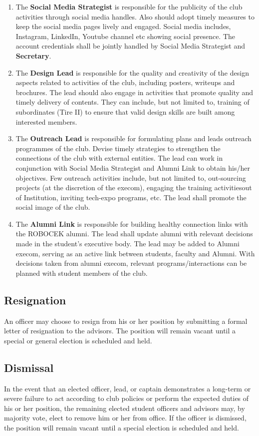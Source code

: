 \begin{enumerate}
	\item The \textbf{Social Media Strategist} is responsible for the publicity of the club
activities through social media handles. Also should adopt timely
	measures to keep the social media pages lively and engaged. Social
media includes, Instagram, LinkedIn, Youtube channel etc showing social
presence. The account credentials shall be jointly handled by Social
Media Strategist and \textbf{Secretary}.
	
	\item The \textbf{Design Lead} is responsible for the quality and creativity of the design
aspects related to activities of the club, including posters, writeups and
brochures. The lead should also engage in activities that promote quality
and timely delivery of contents. They can include, but not limited to,
training of subordinates (Tire II) to ensure that valid design skills are built
among interested members.
	
	\item The \textbf{Outreach Lead} is responsible for formulating plans and leads
outreach programmes of the club. Devise timely strategies to strengthen
the connections of the club with external entities. The lead can work in
conjunction with Social Media Strategist and Alumni Link to obtain his/her
objectives. Few outreach activities include, but not limited to, out-sourcing
projects (at the discretion of the execom), engaging the training activitiesout of Institution, inviting tech-expo programs, etc. The lead shall promote
the social image of the club.
	
	\item The \textbf{Alumni Link} is responsible for building healthy connection links with
the ROBOCEK alumni. The lead shall update alumni with relevant
decisions made in the student's executive body. The lead may be added to
Alumni execom, serving as an active link between students, faculty and
Alumni.
With
decisions
taken
from
alumni
execom,
relevant
programs/interactions can be planned with student members of the club.
	
\end{enumerate}

\subsection{Resignation}
An officer may choose to resign from his or her position by submitting a
formal letter of resignation to the advisors. The position will remain vacant
until a special or general election is scheduled and held.

\subsection{Dismissal}
In the event that an elected officer, lead, or captain demonstrates a
long-term or severe failure to act according to club policies or perform the
expected duties of his or her position, the remaining elected student
officers and advisors may, by majority vote, elect to remove him or her
from office. If the officer is dismissed, the position will remain vacant until a
special election is scheduled and held.